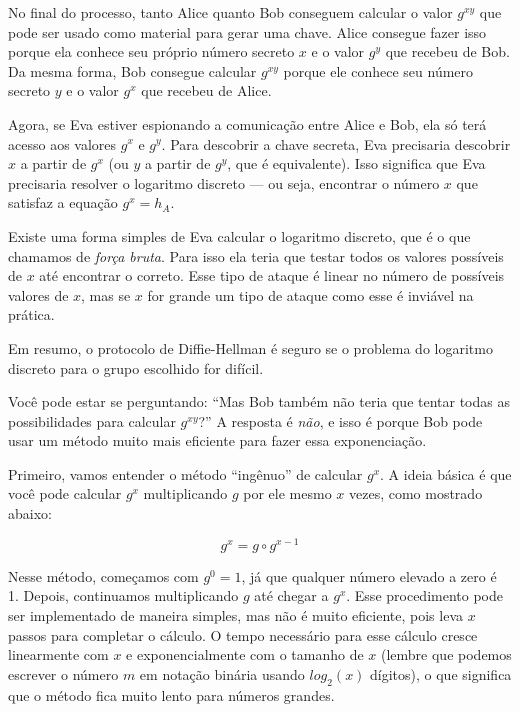 No final do processo, tanto Alice quanto Bob conseguem calcular o valor $g^{xy}$ que pode ser usado como material para gerar uma chave.
Alice consegue fazer isso porque ela conhece seu próprio número secreto $x$ e o valor $g^y$ que recebeu de Bob.
Da mesma forma, Bob consegue calcular $g^{xy}$ porque ele conhece seu número secreto $y$ e o valor $g^x$ que recebeu de Alice.

Agora, se Eva estiver espionando a comunicação entre Alice e Bob, ela só terá acesso aos valores $g^x$ e $g^y$.
Para descobrir a chave secreta, Eva precisaria descobrir $x$ a partir de $g^x$ (ou $y$ a partir de $g^y$, que é equivalente).
Isso significa que Eva precisaria resolver o logaritmo discreto — ou seja, encontrar o número $x$ que satisfaz a equação $g^x = h_A$.

Existe uma forma simples de Eva calcular o logaritmo discreto, que é o que chamamos de {\em força bruta}.
Para isso ela teria que testar todos os valores possíveis de $x$ até encontrar o correto. Esse tipo de ataque é linear no número de possíveis valores de $x$, mas se $x$ for grande um tipo de ataque como esse é inviável na prática.

Em resumo, o protocolo de Diffie-Hellman é seguro se o problema do logaritmo discreto para o grupo escolhido for difícil.


Você pode estar se perguntando:
``Mas Bob também não teria que tentar todas as possibilidades para calcular \( g^{xy} \)?''
A resposta é {\em não}, e isso é porque Bob pode usar um método muito mais eficiente para fazer essa exponenciação.

Primeiro, vamos entender o método ``ingênuo'' de calcular $g^x$.
A ideia básica é que você pode calcular $g^x$ multiplicando $g$ por ele mesmo $x$ vezes, como mostrado abaixo:

\begin{displaymath}
  g^x = g \circ g^{x-1}
\end{displaymath}

Nesse método, começamos com $g^0 = 1$, já que qualquer número elevado a zero é 1.
Depois, continuamos multiplicando $g$ até chegar a $g^x$.
Esse procedimento pode ser implementado de maneira simples, mas não é muito eficiente, pois leva $x$ passos para completar o cálculo.
O tempo necessário para esse cálculo cresce linearmente com $x$ e exponencialmente com o tamanho de $x$ (lembre que podemos escrever o número $m$ em notação binária usando $log_2(x)$ dígitos), o que significa que o método fica muito lento para números grandes.

